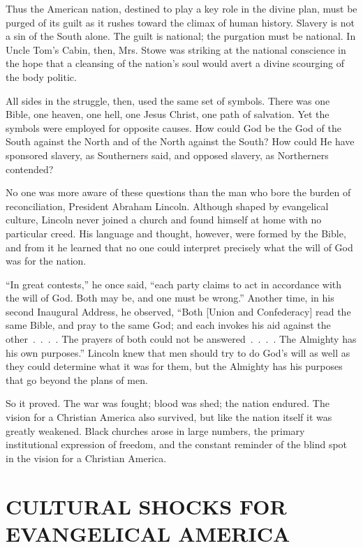 Thus the American nation, destined to play a key role in the divine plan, must be purged of its
guilt as it rushes toward the climax of human history. Slavery is not a sin of the South alone. The
guilt is national; the purgation must be national. In Uncle Tom’s Cabin, then, Mrs. Stowe was
striking at the national conscience in the hope that a cleansing of the nation’s soul would avert a
divine scourging of the body politic.

All sides in the struggle, then, used the same set of symbols. There was one Bible, one heaven, one
hell, one Jesus Christ, one path of salvation. Yet the symbols were employed for opposite causes.
How could God be the God of the South against the North and of the North against the South? How
could He have sponsored slavery, as Southerners said, and opposed slavery, as Northerners contended?

No one was more aware of these questions than the man who bore the burden of reconciliation,
President Abraham Lincoln. Although shaped by evangelical culture, Lincoln never joined a church and
found himself at home with no particular creed. His language and thought, however, were formed by
the Bible, and from it he learned that no one could interpret precisely what the will of God was for
the nation.


“In great contests,” he once said, “each party claims to act in accordance with the will of God.
Both may be, and one must be wrong.” Another time, in his second Inaugural Address, he observed,
“Both [Union and Confederacy] read the same Bible, and pray to the same God; and each invokes his
aid against the other~.~.~.~. The prayers of both could not be answered~.~.~.~. The Almighty has his
own purposes.” Lincoln knew that men should try to do God’s will as well as they could determine
what it was for them, but the Almighty has his purposes that go beyond the plans of men.

So it proved. The war was fought; blood was shed; the nation endured. The vision for a Christian
America also survived, but like the nation itself it was greatly weakened. Black churches arose in
large numbers, the primary institutional expression of freedom, and the constant reminder of the
blind spot in the vision for a Christian America.

\section{CULTURAL SHOCKS FOR EVANGELICAL AMERICA}

